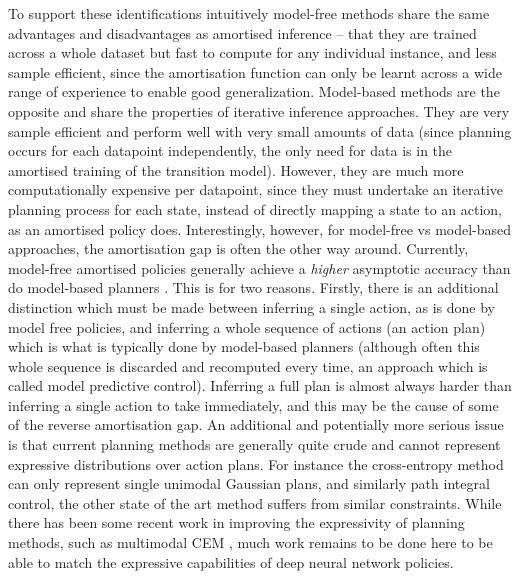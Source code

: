 To support these identifications intuitively model-free methods share the same advantages and disadvantages as amortised inference -- that they are trained across a whole dataset but fast to compute for any individual instance, and less sample efficient, since the amortisation function can only be learnt across a wide range of experience to enable good generalization. Model-based methods are the opposite and share the properties of iterative inference approaches. They are very sample efficient and perform well with very small amounts of data (since planning occurs for each datapoint independently, the only need for data is in the amortised training of the transition model). However, they are much more computationally expensive per datapoint, since they must undertake an iterative planning process for each state, instead of directly mapping a state to an action, as an amortised policy does. Interestingly, however, for model-free vs model-based approaches, the amortisation gap is often the other way around. Currently, model-free amortised policies generally achieve a \emph{higher} asymptotic accuracy than do model-based planners \citep{hafner2019dream,shyam_model-based_2019,haarnoja2018soft}. This is for two reasons. Firstly, there is an additional distinction which must be made between inferring a single action, as is done by model free policies, and inferring a whole sequence of actions (an action plan) which is what is typically done by model-based planners (although often this whole sequence is discarded and recomputed every time, an approach which is called model predictive control). Inferring a full plan is almost always harder than inferring a single action to take immediately, and this may be the cause of some of the reverse amortisation gap. An additional and potentially more serious issue is that current planning methods are generally quite crude and cannot represent expressive distributions over action plans. For instance the cross-entropy method can only represent single unimodal Gaussian plans, and similarly path integral control, the other state of the art method \citep{williams2017information,williams2017model,williams2018predictive,theodorou2010reinforcement,theodorou2012relative} suffers from similar constraints. While there has been some recent work in improving the expressivity of planning methods, such as multimodal CEM \citep{okada2020planet}, much work remains to be done here to be able to match the expressive capabilities of deep neural network policies.

